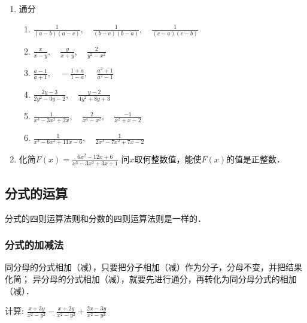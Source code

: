 \begin{ex}
\begin{enumerate}
\item  通分
\begin{enumerate}
\item  $\frac{1}{(a-b)(a-c)},\quad  \frac{1}{(b-c)(b-a)}, \quad \frac{1}{(c-a)(c-b)}$
\item $\frac{x}{x-y},\quad  \frac{y}{x+y}, \quad \frac{2}{y^{2}-x^{2}}$
\item  $\frac{a-1}{a+1},\quad -\frac{1+a}{1-a}, \quad \frac{a^{2}+1}{a^{2}-1}$
\item  $\frac{2 y-3}{2 y^{2}-3 y-2}, \quad \frac{y-2}{4 y^{2}+8 y+3}$
\item  $\frac{1}{x^{3}-3 x^{2}+2 x}, \quad \frac{2}{x^{4}-x^{2}}, \quad \frac{-1}{x^{2}+x-2}$
\item  $\frac{1}{x^{3}-6 x^{2}+11 x-6}, \quad \frac{1}{2 x^{3}-7 x^{2}+7 x-2}$
\end{enumerate}

\item 化简$F(x)=\frac{6x^2-12x+6}{x^3-3x^2+3x+1}$ 问$x$取何整数值，能使$F(x)$的值是正整数．
\end{enumerate}
\end{ex}

\subsection{分式的运算}
分式的四则运算法则和分数的四则运算法则是一样的．

\subsubsection{分式的加减法}

同分母的分式相加（减），只要把分子相加（减）作为分子，分母不变，并把结果化简；
异分母的分式相加（减），就要先进行通分，再转化为同分母分式的相加（减）．


\begin{example}
    计算: $\frac{x+3 y}{x^{2}-y^{2}}-\frac{x+2 y}{x^{2}-y^{2}}+\frac{2x-3y}{x^2-y^2}$
\end{example}


